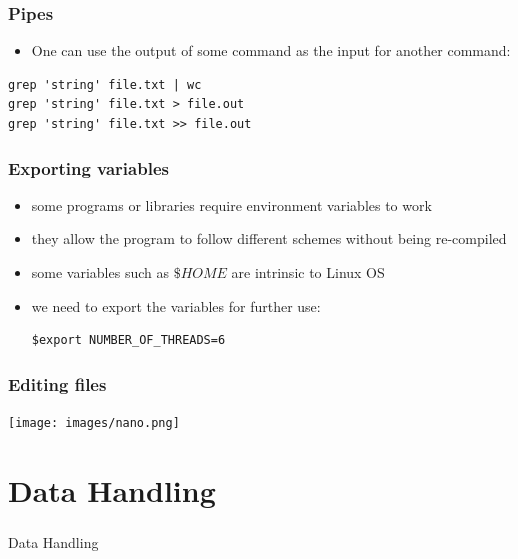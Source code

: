 \begin{frame}[fragile]
	\frametitle{Pipes}
	\begin{itemize}
         \item  One can use the output of some command as the input for another command:
	\end{itemize}

\begin{verbatim}
grep 'string' file.txt | wc 
grep 'string' file.txt > file.out
grep 'string' file.txt >> file.out
\end{verbatim}

\end{frame}
\begin{frame}[fragile]
	\frametitle{Exporting variables}

\begin{itemize}
   \item some programs or libraries require environment variables to work
   \item they allow the program to follow different schemes without being re-compiled
   \item some variables such as $\$HOME$ are intrinsic to Linux OS
   \item we need to export the variables for further use:

\begin{verbatim}
$export NUMBER_OF_THREADS=6
\end{verbatim}
\end{itemize}

\end{frame}
\begin{frame}
	\frametitle{Editing files}
        \begin{center}
        \texttt{[image: images/nano.png]}
        \end{center}
\end{frame}

\section{Data Handling}
\begin{frame}[fragile]
	\frametitle{}
\begin{center}
{\Huge
Data Handling
}
\end{center}

\end{frame}


